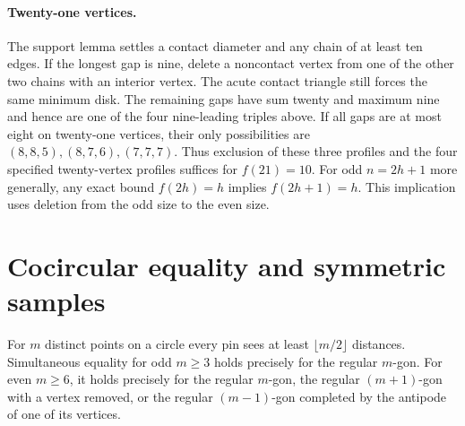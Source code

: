 \paragraph{Twenty-one vertices.}
The support lemma settles a contact diameter and any chain of at least ten edges. If the longest gap is nine, delete a noncontact vertex from one of the other two chains with an interior vertex. The acute contact triangle still forces the same minimum disk. The remaining gaps have sum twenty and maximum nine and hence are one of the four nine-leading triples above. If all gaps are at most eight on twenty-one vertices, their only possibilities are \((8,8,5),(8,7,6),(7,7,7)\). Thus exclusion of these three profiles and the four specified twenty-vertex profiles suffices for \(f(21)=10\). For odd \(n=2h+1\) more generally, any exact bound \(f(2h)=h\) implies \(f(2h+1)=h\). This implication uses deletion from the odd size to the even size.

\section{Cocircular equality and symmetric samples}

\begin{theorem}[982-C01, 982-C02, 982-C03]
For \(m\) distinct points on a circle every pin sees at least \(\lfloor m/2\rfloor\) distances. Simultaneous equality for odd \(m\ge3\) holds precisely for the regular \(m\)-gon. For even \(m\ge6\), it holds precisely for the regular \(m\)-gon, the regular \((m+1)\)-gon with a vertex removed, or the regular \((m-1)\)-gon completed by the antipode of one of its vertices.
\end{theorem}

